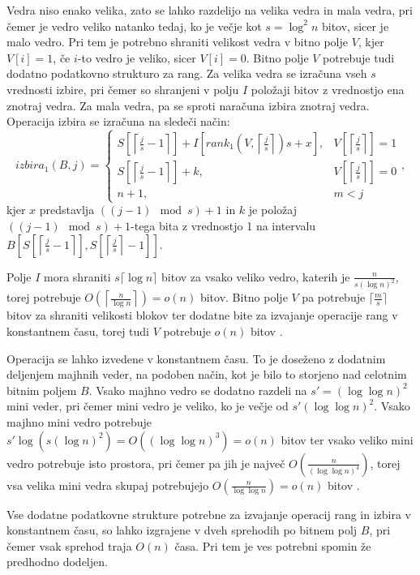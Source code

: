 Vedra niso enako velika, zato se lahko razdelijo na velika vedra in mala vedra, pri čemer je vedro veliko natanko tedaj, ko je večje kot $s=\log^2 n$ bitov, sicer je malo vedro. Pri tem je potrebno shraniti velikost vedra v bitno polje $V$, kjer $V[i]=1$, če $i$-to vedro je veliko, sicer  $V[i]=0$. Bitno polje $V$ potrebuje tudi dodatno podatkovno strukturo za rang. Za velika vedra se izračuna vseh $s$ vrednosti izbire, pri čemer so shranjeni v polju $I$ položaji bitov z vrednostjo ena znotraj vedra. Za mala vedra, pa se sproti naračuna izbira znotraj vedra. Operacija izbira se izračuna na sledeči način:
\begin{equation}
    izbira_1(B,j)=\left\{
    \begin{array}{rl}
       S\left[\left\lceil \frac{j}{s} -1\right\rceil\right] + I\left[rank_1(V,\left\lceil \frac{j}{s} \right\rceil)s+x\right], & V\left[\left\lceil \frac{j}{s} \right\rceil\right] = 1\\ 
       S\left[\left\lceil \frac{j}{s} -1 \right\rceil\right] + k, & V\left[\left\lceil \frac{j}{s} \right\rceil\right] = 0\\
       n+1, & m < j
    \end{array}\right.,
\end{equation}
kjer $x$ predstavlja $((j-1) \mod{s})+1$ in $k$ je položaj $((j-1) \mod{s})+1$-tega bita z vrednostjo 1 na intervalu $B\left[ S\left[\left\lceil \frac{j}{s} -1 \right\rceil\right], S\left[\left\lceil \frac{j}{s} \right\rceil-1\right]\right]$.

Polje $I$ mora shraniti $s\lceil\log n\rceil$ bitov za vsako veliko vedro, katerih je $\frac{n}{s(\log n)^2}$, torej potrebuje $O\left(\left\lceil\frac{n}{\log n}\right\rceil\right)=o(n)$ bitov. Bitno polje $V$ pa potrebuje $\lceil \frac{m}{s} \rceil$ bitov za shraniti velikosti blokov ter dodatne bite za izvajanje operacije rang v konstantnem času, torej tudi $V$ potrebuje $o(n)$ bitov \cite{Navarro2016}.

Operacija se lahko izvedene v konstantnem času. To je doseženo z dodatnim deljenjem majhnih veder, na podoben način, kot je bilo to storjeno nad celotnim bitnim poljem $B$. Vsako majhno vedro se dodatno razdeli na $s'=(\log\log n)^2$ mini veder, pri čemer mini vedro je veliko, ko je večje od $s'(\log\log n)^2$. Vsako majhno mini vedro potrebuje $s'\log{(s(\log{n})^2)}=O((\log\log n)^3)=o(n)$ bitov ter vsako veliko mini vedro potrebuje isto prostora, pri čemer pa jih je največ $O\left(\frac{n}{(\log\log n)^4}\right)$, torej vsa velika mini vedra skupaj potrebujejo $O\left(\frac{n}{\log\log n}\right) =o(n)$ bitov \cite{Navarro2016}.


Vse dodatne podatkovne strukture potrebne za izvajanje operacij rang in izbira v konstantnem času, so lahko izgrajene v dveh sprehodih po bitnem polj $B$, pri čemer vsak sprehod traja $O(n)$ časa. Pri tem je ves potrebni spomin že predhodno dodeljen.
